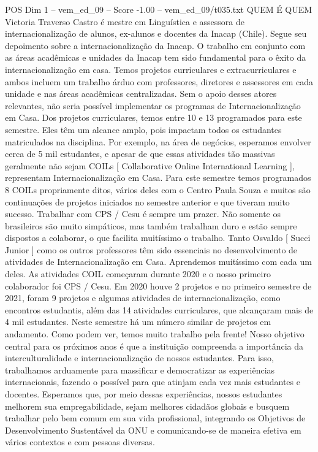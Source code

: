 \begin{textsample}{POS Dim 1 – vem\_ed\_09 – Score -1.00 – vem\_ed\_09/t035.txt}  \label{ex:f1_pos_079}
QUEM É QUEM Victoria Traverso Castro é mestre em Linguística e assessora de internacionalização de alunos, ex-alunos e docentes da Inacap (Chile).
Segue seu depoimento sobre a internacionalização da Inacap.
O trabalho em conjunto com as áreas acadêmicas e unidades da Inacap tem sido fundamental para o êxito da internacionalização em casa.
Temos projetos curriculares e extracurriculares e ambos incluem um trabalho árduo com professores, diretores e assessores em cada unidade e nas áreas acadêmicas centralizadas.
Sem o apoio desses atores relevantes, não seria possível implementar os programas de Internacionalização em Casa.
Dos projetos curriculares, temos entre 10 e 13 programados para este semestre.
Eles têm um alcance amplo, pois impactam todos os estudantes matriculados na disciplina.
Por exemplo, na área de negócios, esperamos envolver cerca de 5 mil estudantes, e apesar de que essas atividades tão massivas geralmente não sejam COILs [ Collaborative Online International Learning ], representam Internacionalização em Casa.
Para este semestre temos programados 8 COILs propriamente ditos, vários deles com o Centro Paula Souza e muitos são continuações de projetos iniciados no semestre anterior e que tiveram muito sucesso.
Trabalhar com CPS / Cesu é sempre um prazer.
Não somente os brasileiros são muito simpáticos, mas também trabalham duro e estão sempre dispostos a colaborar, o que facilita muitíssimo o trabalho.
Tanto Osvaldo [ Succi Junior ] como os outros professores têm sido essenciais no desenvolvimento de atividades de Internacionalização em Casa.
Aprendemos muitíssimo com cada um deles.
As atividades COIL começaram durante 2020 e o nosso primeiro colaborador foi CPS / Cesu.
Em 2020 houve 2 projetos e no primeiro semestre de 2021, foram 9 projetos e algumas atividades de internacionalização, como encontros estudantis, além das 14 atividades curriculares, que alcançaram mais de 4 mil estudantes.
Neste semestre há um número similar de projetos em andamento.
Como podem ver, temos muito trabalho pela frente!
Nosso objetivo central para os próximos anos é que a instituição compreenda a importância da interculturalidade e internacionalização de nossos estudantes.
Para isso, trabalhamos arduamente para massificar e democratizar as experiências internacionais, fazendo o possível para que atinjam cada vez mais estudantes e docentes.
Esperamos que, por meio dessas experiências, nossos estudantes melhorem sua empregabilidade, sejam melhores cidadãos globais e busquem trabalhar pelo bem comum em sua vida profissional, integrando os Objetivos de Desenvolvimento Sustentável da ONU e comunicando-se de maneira efetiva em vários contextos e com pessoas diversas.

\end{textsample}
